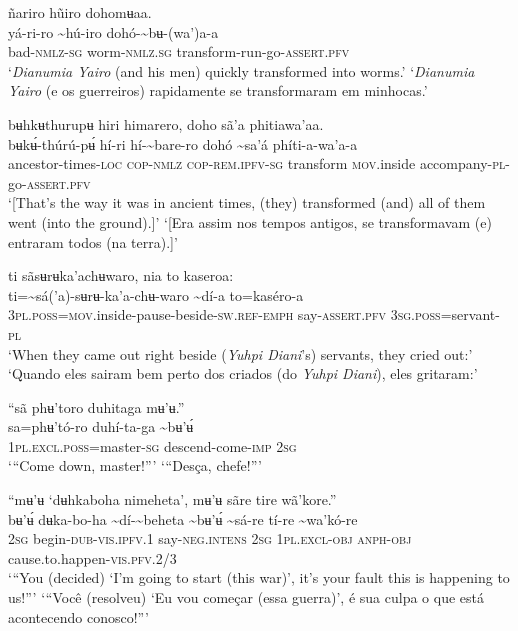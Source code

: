 \documentclass[output=paper,
modfonts,nonflat
]{langsci/langscibook}
\begin{document}
  
\ea ñariro hũiro dohomʉaa.  \\[.3em]
\gll {\textasciitilde}yá-ri-ro	{\textasciitilde}hú-iro	dohó-{\textasciitilde}bʉ{\footnotemark}-(wa’)a-a \\
     bad\textsc{-nmlz-sg}	worm\textsc{-nmlz.sg}	transform-run-go-\textsc{assert.pfv}\\
\glt ‘\textit{Dianumia Yairo} (and his men) quickly transformed into worms.’
\glt ‘\textit{Dianumia Yairo} (e os guerreiros) rapidamente se transformaram em minhocas.’
\z 

\ea bʉhkʉthurupʉ hiri himarero, doho sã'a phitiawa'aa. \\[.3em]
\gll bʉkʉ́-thúrú-pʉ́	hí-ri	hí-{\textasciitilde}bare-ro	dohó	{\textasciitilde}sa'á	phíti-a-wa'a-a \\
     ancestor-times\textsc{-loc}	\textsc{cop-nmlz}	\textsc{cop-rem.ipfv-sg}	transform	\textsc{mov.}inside	accompany\textsc{-pl}-go-\textsc{assert.pfv}\\
\glt ‘[That's the way it was in ancient times, (they) transformed (and) all of them went (into the ground).]’
\glt ‘[Era assim nos tempos antigos, se transformavam (e) entraram todos (na terra).]’
\z

\largerpage[2]
\ea ti sãsʉrʉka'achʉwaro, nia to kaseroa: \\[.3em]
\gll ti={\textasciitilde}sá('a)-sʉrʉ-ka'a-chʉ-waro	{\textasciitilde}dí-a	to=kaséro-a \\
     3\textsc{pl.poss}=\textsc{mov.}inside-pause-beside-\textsc{sw.ref-emph}	say-\textsc{assert.pfv}	3\textsc{sg.poss}=servant\textsc{-pl}\\
\glt ‘When they came out right beside (\textit{Yuhpi Diani}'s) servants, they cried out:’
\glt ‘Quando eles sairam bem perto dos criados (do \textit{Yuhpi Diani}), eles gritaram:’
\z 
\newpage 

\ea “sã phʉ'toro duhitaga mʉ'ʉ.” \\[.3em]
\gll {\textasciitilde}sa=phʉ'tó-ro	duhí-ta-ga	{\textasciitilde}bʉ'ʉ́ \\
     1\textsc{pl.excl.poss}=master\textsc{-sg}	descend-come-\textsc{imp}	2\textsc{sg}\\
\glt ‘“Come down, master!”’
\glt ‘“Desça, chefe!”’
\z 

 
\ea “mʉ'ʉ ‘dʉhkaboha nimeheta’, mʉ'ʉ sãre tire wã'kore.” \\[.3em]
\gll {\textasciitilde}bʉ'ʉ́	dʉka-bo-ha	{\textasciitilde}dí-{\textasciitilde}beheta	{\textasciitilde}bʉ'ʉ́	{\textasciitilde}sá-re	tí-re	{\textasciitilde}wa'kó-re \\
     2\textsc{sg}	begin-\textsc{dub-vis.ipfv.}1	say\textsc{-neg.intens}	2\textsc{sg}	1\textsc{pl.excl-obj}	\textsc{anph-obj}	cause.to.happen-\textsc{vis.pfv.}2/3\\
\glt ‘“You (decided) ‘I’m going to start (this war)’, it's your fault this is happening to us!”’
\glt ‘“Você (resolveu) ‘Eu vou começar (essa guerra)’, é sua culpa o que está acontecendo conosco!”’
\z 
\end{document}
